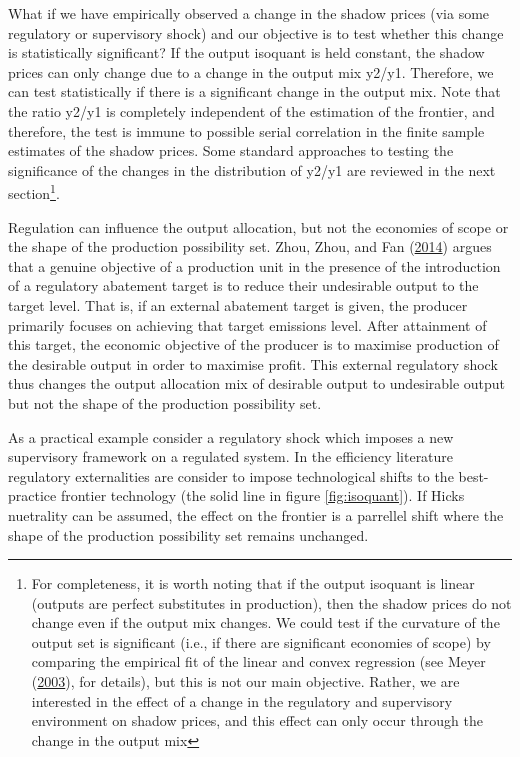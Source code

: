 \documentclass[
  12pt,
]{article}
\begin{document}
What if we have empirically observed a change in the shadow prices (via some regulatory or supervisory shock) and our objective is to test whether this change is statistically significant? If the output isoquant is held constant, the shadow prices can only change due to a change in the output mix y2/y1. Therefore, we can test statistically if there is a significant change in the output mix. Note that the ratio y2/y1 is completely independent of the estimation of the frontier, and therefore, the test is immune to possible serial correlation in the finite sample estimates of the shadow prices. Some standard approaches to testing the significance of the changes in the distribution of y2/y1 are reviewed in the next section\footnote{For completeness, it is worth noting that if the output isoquant is linear (outputs are perfect substitutes in production), then the shadow prices do not change even if the output mix changes. We could test if the curvature of the output set is significant (i.e., if there are significant economies of scope) by comparing the empirical fit of the linear and convex regression (see Meyer (\protect\hyperlink{ref-Meyer2003}{2003}), for details), but this is not our main objective. Rather, we are interested in the effect of a change in the regulatory and supervisory environment on shadow prices, and this effect can only occur through the change in the output mix}.

Regulation can influence the output allocation, but not the economies of scope or the shape of the production possibility set. Zhou, Zhou, and Fan (\protect\hyperlink{ref-Zhou2014}{2014}) argues that a genuine objective of a production unit in the presence of the introduction of a regulatory abatement target is to reduce their undesirable output to the target level. That is, if an external abatement target is given, the producer primarily focuses on achieving that target emissions level. After attainment of this target, the economic objective of the producer is to maximise production of the desirable output in order to maximise profit. This external regulatory shock thus changes the output allocation mix of desirable output to undesirable output but not the shape of the production possibility set.

As a practical example consider a regulatory shock which imposes a new supervisory framework on a regulated system. In the efficiency literature regulatory externalities are consider to impose technological shifts to the best-practice frontier technology (the solid line in figure \ref{fig:isoquant}). If Hicks nuetrality can be assumed, the effect on the frontier is a parrellel shift where the shape of the production possibility set remains unchanged.
\end{document}
